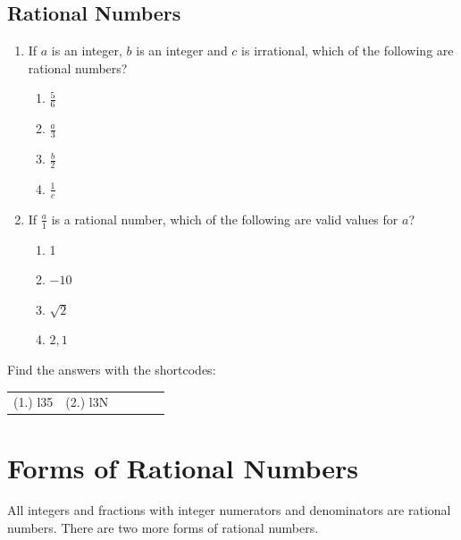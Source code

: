             \subsection{ Rational Numbers }
            \nopagebreak
            \label{m38348*id63121}\begin{enumerate}[noitemsep, label=\textbf{\arabic*}. ] 
            \label{m38348*uid9}\item If $a$ is an integer, $b$ is an integer and $c$ is irrational, which of the following are rational numbers? 
\label{m38348*id734}\begin{enumerate}[noitemsep, label=\textbf{\alph*}. ] 
            \item $\frac{5}{6}$\newline
    \item $\frac{a}{3}$\newline
    \item $\frac{b}{2}$\newline
    \item $\frac{1}{c}$\end{enumerate}
        \label{m38348*uid10}\item If $\frac{a}{1}$ is a rational number, which of the following are valid values for $a$?\label{m38348*id7432}\begin{enumerate}[noitemsep, label=\textbf{\alph*}. ] 
            \item 1\item $-10$\item $\sqrt{2}$\item $2,1$\end{enumerate}
        \end{enumerate}
\par {} Find the answers with the shortcodes:
 \par \begin{tabular}[h]{cccccc}
 (1.) l35  &  (2.) l3N  & \end{tabular}
    \section{ Forms of Rational Numbers}
            \nopagebreak
      \label{m38348*id63345}All integers and fractions with integer numerators and denominators are rational numbers. There are two more forms of rational numbers.\par 
\label{m38348*secfhsst!!!underscore!!!id245}
